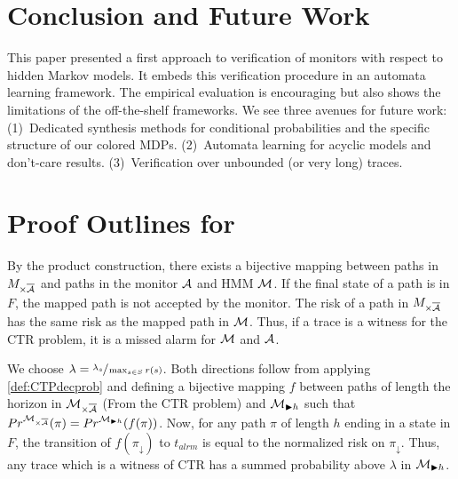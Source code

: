 \documentclass[runningheads]{llncs}
\newcommand{\talrm}{t_{alrm}}
\begin{document}
\section{Conclusion and Future Work}
This paper presented a first approach to verification of monitors with respect to hidden Markov models. It embeds this verification procedure in an automata learning framework. The empirical evaluation is encouraging but also shows the limitations of the off-the-shelf frameworks. We see three avenues for future work: (1)~Dedicated synthesis methods for conditional probabilities and the specific structure of our colored MDPs. (2)~Automata learning for acyclic models and don't-care results.
(3)~Verification over unbounded (or very long) traces.


\clearpage
\printbibliography{}
% 
% 
\clearpage

\appendix


\section{Proof Outlines for }\label{app:proofs}
\toctp*
\begin{proofoutline}
    By the product construction, there exists a bijective mapping between paths in $M_{\times\overline{\mathcal{A}}}$ and paths in the monitor $\mathcal{A}$ and HMM $\mathcal{M}$. If the final state of a path is in $F$, the mapped path is not accepted by the monitor. The risk of a path in $M_{\times\overline{\mathcal{A}}}$ has the same risk as the mapped path in $\mathcal{M}$. Thus, if a trace is a witness for the CTR problem, it is a missed alarm for $\mathcal{M}$ and $\mathcal{A}$.
\end{proofoutline}

\toactp*
\begin{proofoutline}
    We choose $\lambda = \sfrac{\lambda_s}{\max_{s\in S}r(s)}$. Both directions follow from applying \cref{def:CTPdecprob} and defining a bijective mapping $f$ between paths of length the horizon in $\mathcal{M}_{\times\overline{\mathcal{A}}}$ (From the CTR problem) and $\mathcal{M}_{\blacktriangleright h}$ such that ${Pr}^{\mathcal{M}_{\times\overline{\mathcal{A}}}}(\pi) = {Pr}^{\mathcal{M}_{\blacktriangleright h}}(f(\pi))$. Now, for any path $\pi$ of length $h$ ending in a state in $F$, the transition of $f(\pi_\downarrow)$ to $\talrm$ is equal to the normalized risk on $\pi_\downarrow$.
    Thus, any trace which is a witness of CTR has a summed probability above $\lambda$ in $\mathcal{M}_{\blacktriangleright h}$.
\end{proofoutline}
\end{document}
